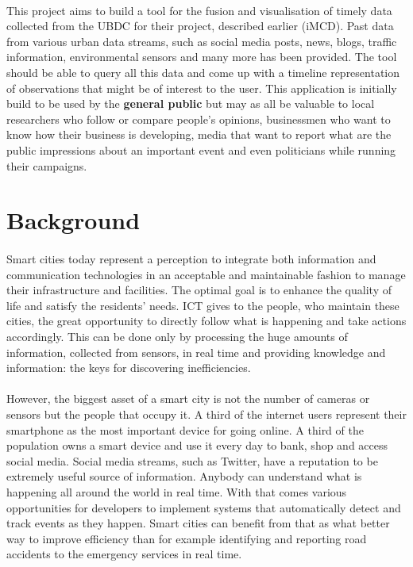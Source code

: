 \documentclass{l4proj}
\begin{document}
\paragraph{}
This project aims to build a tool for the fusion and visualisation of timely data collected from the UBDC for their project, described earlier (iMCD). Past data from various urban data streams, such as social media posts, news, blogs, traffic information, environmental sensors and many more has been provided. The tool should be able to query all this data and come up with a timeline representation of observations that might be of interest to the user. This application is initially build to be used by the \textbf{general public} but may as all be valuable to local researchers who follow or compare people’s opinions, businessmen who want to know how their business is developing, media that want to report what are the public impressions about an important event and even politicians while running their campaigns.   

\section{Background}
\paragraph{}
Smart cities today represent a perception to integrate both information and communication technologies in an acceptable and maintainable fashion to manage their infrastructure and facilities. The optimal goal is to enhance the quality of life and satisfy the residents’ needs. ICT gives to the people, who maintain these cities, the great opportunity to directly follow what is happening and take actions accordingly. This can be done only by processing the huge amounts of information, collected from sensors, in real time and providing knowledge and information: the keys for discovering inefficiencies. 
\paragraph{}
However, the biggest asset of a smart city is not the number of cameras or sensors but the people that occupy it. A third of the internet users\cite{ofcomreport1} represent their smartphone as the most important device for going online. A third of the population owns a smart device and use it every day to bank, shop and access social media. Social media streams, such as Twitter, have a reputation to be extremely useful source of information. Anybody can understand what is happening all around the world in real time. With that comes various opportunities for developers to implement systems that automatically detect and track events as they happen. Smart cities can benefit from that as what better way to improve efficiency than for example identifying and reporting road accidents to the emergency services in real time.
\end{document}
